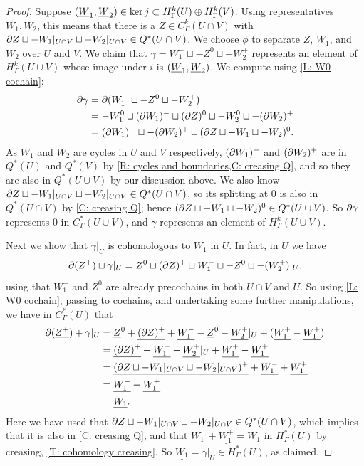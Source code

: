 \begin{proof}
	Suppose $(\underline{W}_1,\underline{W}_2) \in \ker j \subset H^k_\Gamma(U) \oplus H^k_\Gamma(V)$.
	Using representatives $W_1,W_2$, this means that there is a $Z \in C^k_\Gamma(U \cap V)$ with $\partial Z \sqcup - W_1|_{U \cap V} \sqcup - W_2|_{U \cap V} \in Q^*(U \cap V)$.
	We choose $\phi$ to separate $Z$, $W_1$, and $W_2$ over $U$ and $V$.
	We claim that $\gamma = W_1^- \sqcup -Z^0 \sqcup -W_2^+$ represents an element of $H^k_\Gamma(U \cup V)$ whose image under $i$ is $(\underline{W}_1,\underline{W}_2)$.
	We compute using \cref{L: W0 cochain}:
	\begin{align*}
	\partial \gamma& = \partial (W_1^- \sqcup - Z^0 \sqcup -W_2^+)\\
		& = -W_1^0 \sqcup (\partial W_1)^- \sqcup (\partial Z)^0 \sqcup - W_2^0 \sqcup - (\partial W_2)^+\\
		& = (\partial W_1)^- \sqcup - (\partial W_2)^+ \sqcup (\partial Z \sqcup -W_1 \sqcup - W_2)^0.
	\end{align*}
	As $W_1$ and $W_2$ are cycles in $U$ and $V$ respectively, $(\partial W_1)^-$ and $(\partial W_2)^+$ are in $Q^*(U)$ and $Q^*(V)$ by \cref{R: cycles and boundaries,C: creasing Q}, and so they are also in $Q^*(U \cup V)$ by our discussion above.
	We also know $\partial Z \sqcup - W_1|_{U \cap V} \sqcup - W_2|_{U \cap V} \in Q^*(U \cap V)$, so its splitting at $0$ is also in $Q^*(U \cap V)$ by \cref{C: creasing Q}; hence $(\partial Z \sqcup -W_1 \sqcup - W_2)^0 \in Q^*(U \cup V)$.
	So $\partial \gamma$ represents $0$ in $C^*_\Gamma(U \cup V)$, and $\gamma$ represents an element of $H^k_\Gamma(U \cup V)$.

	Next we show that $\gamma|_U$ is cohomologous to $W_1$ in $U$.
	In fact, in $U$ we have
	\[\partial (Z^+) \sqcup \gamma|_U = Z^0 \sqcup (\partial Z)^+ \sqcup W_1^- \sqcup -Z^0 \sqcup -(W_2^+)|_U,\]
	using that $W_1^-$ and $Z^0$ are already precochains in both $U \cap V$ and $U$.
	So using \cref{L: W0 cochain}, passing to cochains, and undertaking some further manipulations, we have in $C^*_\Gamma(U)$ that
	\begin{align*}
	\partial (\underline{Z^+}) + \underline{\gamma}|_U &
		= \underline Z^0 + \underline{(\partial Z)^+} + \underline{W_1^-} - \underline Z^0 -\underline{W_2^+}|_U + (\underline{W_1^+} - \underline{W_1^+})\\
		&= \underline{(\partial Z)^+} + \underline{W_1^-} -\underline{W_2^+}|_U + \underline{W_1^+} - \underline{W_1^+}\\
		&= \underline{(\partial Z \sqcup - W_1|_{U \cap V} \sqcup - W_2|_{U \cap V})^+} + \underline{W_1^-} + \underline{W_1^+}\\
		&=\underline{W_1^-} + \underline{W_1^+}\\
		&=\underline{W_1}.
	\end{align*}
	Here we have used that $\partial Z \sqcup - W_1|_{U \cap V} \sqcup - W_2|_{U \cap V} \in Q^*(U \cap V)$, which implies that it is also in \cref{C: creasing Q},
	and that $\underline{W_1^-} + \underline{W_1^+}= \underline{W_1}$ in $H^*_\Gamma(U)$ by creasing, \cref{T: cohomology creasing}.
	So $\underline{W_1} = \underline{\gamma}|_U \in H^*_\Gamma(U)$, as claimed.


\end{proof}
